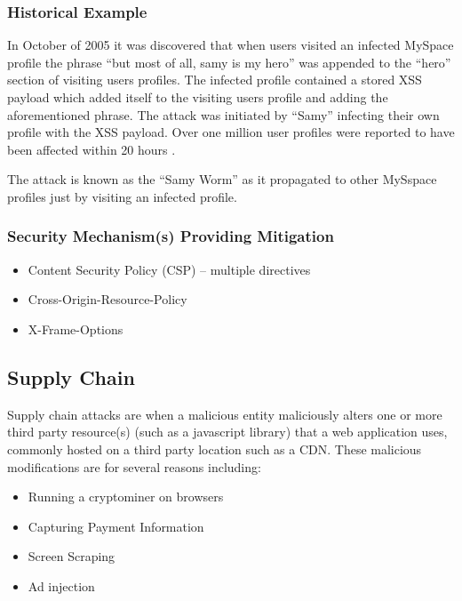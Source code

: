\documentclass{mscreport}
\begin{document}
\subsubsection{Historical Example}
In October of 2005 it was discovered that when users visited an infected MySpace profile the phrase ``but most of all, samy is my hero'' was appended to the ``hero'' section of visiting users profiles. The infected profile contained a stored XSS payload which added itself to the visiting users profile and adding the aforementioned phrase. The attack was initiated by ``Samy'' infecting their own profile with the XSS payload. Over one million user profiles were reported to have been affected within 20 hours \cite{Lee2019-xf}.

\vspace{0.2cm} \noindent
The attack is known as the ``Samy Worm'' as it propagated to other MySspace profiles just by visiting an infected profile.

\subsubsection{Security Mechanism(s) Providing Mitigation}

\begin{itemize}
	\setlength\itemsep{0.1em}
	\item Content Security Policy (CSP) – multiple directives
	\item Cross-Origin-Resource-Policy
	\item X-Frame-Options
\end{itemize}


\subsection{Supply Chain}
\label{subsection:SupplyChain}

Supply chain attacks are when a malicious entity maliciously alters one or more third party resource(s) (such as a javascript library) that a web application uses, commonly hosted on a third party location such as a CDN. These malicious modifications are for several reasons including:

\begin{itemize}
	\setlength\itemsep{0.1em}
	\item Running a cryptominer \cite{Tekiner2021-sq} on browsers
	\item Capturing Payment Information
	\item Screen Scraping
	\item Ad injection
\end{itemize}
\end{document}
